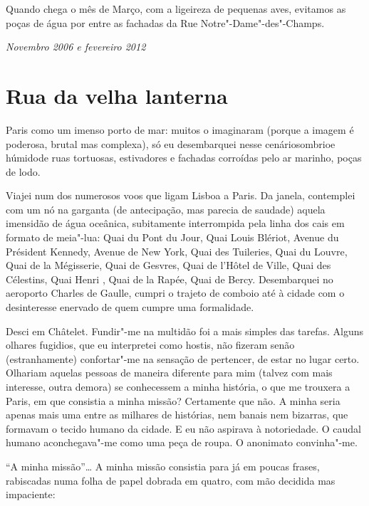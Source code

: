 Quando chega o mês de Março, com a ligeireza de pequenas aves,
evitamos as poças de água por entre as fachadas da Rue
Notre"-Dame"-des"-Champs.

\begin{flushright}
\emph{Novembro 2006 e fevereiro 2012}
\end{flushright}

\chapter{Rua da velha lanterna}

Paris como um imenso porto de mar: muitos o imaginaram (porque a imagem é
poderosa, brutal mas complexa), só eu desembarquei nesse cenáriosombrioe
húmidode ruas tortuosas, estivadores e fachadas corroídas pelo ar
marinho, poças de lodo.

Viajei num dos numerosos voos que ligam Lisboa a Paris. Da janela,
contemplei com um nó na garganta (de antecipação, mas parecia de
saudade) aquela imensidão de água oceânica, subitamente interrompida
pela linha dos cais em formato de meia"-lua: Quai du Pont du Jour, Quai
Louis Blériot, Avenue du Président Kennedy, Avenue de New York, Quai des
Tuileries, Quai du Louvre, Quai de la Mégisserie, Quai de Gesvres, Quai
de l'Hôtel de Ville, Quai des Célestins, Quai Henri , Quai de la
Rapée, Quai de Bercy. Desembarquei no aeroporto Charles de Gaulle,
cumpri o trajeto de comboio até à cidade com o desinteresse enervado de
quem cumpre uma formalidade.

Desci em Châtelet. Fundir"-me na multidão foi a mais simples das tarefas.
Alguns olhares fugidios, que eu interpretei como hostis, não fizeram
senão (estranhamente) confortar"-me
na sensação de pertencer, de estar no lugar certo. Olhariam aquelas
pessoas de maneira diferente para mim (talvez com mais interesse, outra
demora) se conhecessem a minha história, o que me trouxera a Paris, em
que consistia a minha missão? Certamente que não. A minha seria apenas
mais uma entre as milhares de histórias, nem banais nem bizarras, que
formavam o tecido humano da cidade. E eu não aspirava à notoriedade. O
caudal humano aconchegava"-me como uma peça de roupa. O anonimato
convinha"-me.

``A minha missão''\ldots{} A minha missão consistia para já em poucas
frases, rabiscadas numa folha de papel dobrada em quatro, com mão
decidida mas impaciente:

